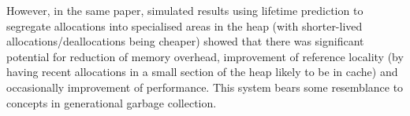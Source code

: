 However, in the same paper, simulated results using lifetime prediction to segregate allocations into specialised areas in the heap (with shorter-lived allocations/deallocations being cheaper) showed that there was significant potential for reduction of memory overhead, improvement of reference locality (by having recent allocations in a small section of the heap likely to be in cache) and occasionally improvement of performance. This system bears some resemblance to concepts in generational garbage collection.
